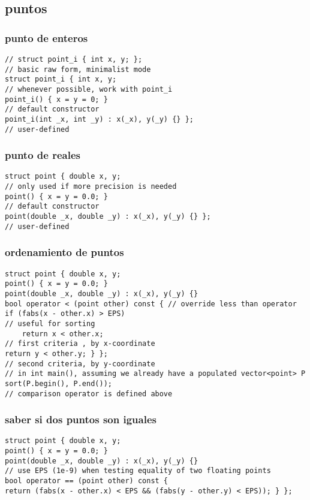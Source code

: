 \subsection{puntos}
\subsubsection{punto de enteros}
\begin{lstlisting}[style=C]
// struct point_i { int x, y; };
// basic raw form, minimalist mode
struct point_i { int x, y;
// whenever possible, work with point_i
point_i() { x = y = 0; }
// default constructor
point_i(int _x, int _y) : x(_x), y(_y) {} };
// user-defined
\end{lstlisting}
\subsubsection{punto de reales}
\begin{lstlisting}[style=C]
struct point { double x, y;
// only used if more precision is needed
point() { x = y = 0.0; }
// default constructor
point(double _x, double _y) : x(_x), y(_y) {} };
// user-defined
\end{lstlisting}
\subsubsection{ordenamiento de puntos}
\begin{lstlisting}[style=C]
struct point { double x, y;
point() { x = y = 0.0; }
point(double _x, double _y) : x(_x), y(_y) {}
bool operator < (point other) const { // override less than operator
if (fabs(x - other.x) > EPS)
// useful for sorting
	return x < other.x;
// first criteria , by x-coordinate
return y < other.y; } };
// second criteria, by y-coordinate
// in int main(), assuming we already have a populated vector<point> P
sort(P.begin(), P.end());
// comparison operator is defined above
\end{lstlisting}
\subsubsection{saber si dos puntos son iguales}
\begin{lstlisting}[style=C]
struct point { double x, y;
point() { x = y = 0.0; }
point(double _x, double _y) : x(_x), y(_y) {}
// use EPS (1e-9) when testing equality of two floating points
bool operator == (point other) const {
return (fabs(x - other.x) < EPS && (fabs(y - other.y) < EPS)); } };
\end{lstlisting}
